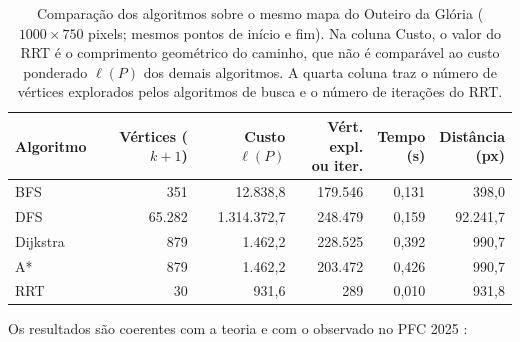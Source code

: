 \documentclass[
    12pt,
    openright,
    oneside,
    a4paper,
    english,
    brazil
]{abntex2}
\begin{document}
\begin{table}[H]
    \centering
    \caption{Comparação dos algoritmos sobre o mesmo mapa do Outeiro da Glória ($1000 \times 750$ pixels; mesmos pontos de início e fim). Na coluna Custo, o valor do RRT é o comprimento geométrico do caminho, que não é comparável ao custo ponderado $\ell(P)$ dos demais algoritmos. A quarta coluna traz o número de vértices explorados pelos algoritmos de busca e o número de iterações do RRT.}
    \label{tab:comparacao_algoritmos}
    \small
    \setlength{\tabcolsep}{5pt}
    \begin{tabular}{lrrrrr}
        \toprule
        \textbf{Algoritmo}
            & \shortstack[r]{\textbf{Vértices}\\\textbf{($k+1$)}}
            & \shortstack[r]{\textbf{Custo}\\\textbf{$\ell(P)$}}
            & \shortstack[r]{\textbf{Vért. expl.}\\\textbf{ou iter.}}
            & \shortstack[r]{\textbf{Tempo}\\\textbf{(s)}}
            & \shortstack[r]{\textbf{Distância}\\\textbf{(px)}} \\
        \midrule
        BFS      &    351 &    12.838,8 & 179.546 & 0,131 &    398,0 \\
        DFS      & 65.282 & 1.314.372,7 & 248.479 & 0,159 & 92.241,7 \\
        Dijkstra &    879 &     1.462,2 & 228.525 & 0,392 &    990,7 \\
        A*       &    879 &     1.462,2 & 203.472 & 0,426 &    990,7 \\
        RRT      &     30 &       931,6 &     289 & 0,010 &    931,8 \\
        \bottomrule
    \end{tabular}
\end{table}

Os resultados são coerentes com a teoria e com o observado no PFC 2025 \cite{camelo2025}:
\end{document}
